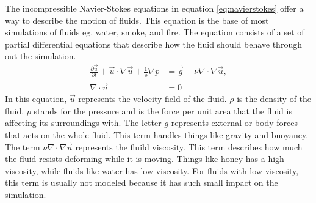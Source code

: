 The incompressible Navier-Stokes equations in equation \ref{eq:navierstokes} offer a way to describe the motion of fluids. 
This equation is the base of most simulations of fluids eg. water, smoke, and fire. 
The equation consists of a set of partial differential equations that describe how the fluid should behave through out the simulation.
\begin{equation}
  \label{eq:navierstokes}
  \begin{split} 
    \frac{\partial \vec{u}}{\partial t} + \vec{u} \cdot \nabla \vec{u} + \frac{1}{\rho} \nabla p &= \vec{g} + \nu \nabla \cdot \nabla \vec{u},\\ 
    \nabla\cdot \vec{u} &= 0
  \end{split}
\end{equation}
In this equation, $\vec{u}$ represents the velocity field of the fluid. 
$\rho$ is the density of the fluid. 
$p$ stands for the pressure and is the force per unit area that the fluid is affecting its surroundings with. 
The letter $g$ represents external or body forces that acts on the whole fluid. 
This term handles things like gravity and buoyancy. 
The term $\nu \nabla \cdot \nabla \vec{u}$ represents the fluild viscosity.
This term describes how much the fluid resists deforming while it is moving. 
Things like honey has a high viscosity, while fluids like water has low viscosity. 
For fluids with low viscosity, this term is usually not modeled because it has such small impact on the simulation.
\\
\\